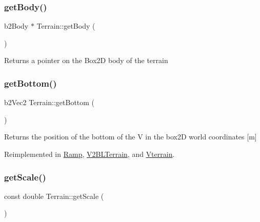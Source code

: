 \mbox{\label{class_terrain_aa0e70c6bbd39935c69c2b6edb74fcd32}} 
\subsubsection{\texorpdfstring{get\+Body()}{getBody()}}
{\footnotesize\ttfamily b2\+Body $\ast$ Terrain\+::get\+Body (\begin{DoxyParamCaption}{ }\end{DoxyParamCaption})}

\begin{DoxyReturn}{Returns}
a pointer on the Box2D body of the terrain 
\end{DoxyReturn}
\mbox{\label{class_terrain_a26e1c7c05b8256015730df34d97d29c2}} 
\subsubsection{\texorpdfstring{get\+Bottom()}{getBottom()}}
{\footnotesize\ttfamily b2\+Vec2 Terrain\+::get\+Bottom (\begin{DoxyParamCaption}{ }\end{DoxyParamCaption})\hspace{0.3cm}{\ttfamily [virtual]}}

\begin{DoxyReturn}{Returns}
the position of the bottom of the V in the box2D world coordinates \mbox{[}m\mbox{]} 
\end{DoxyReturn}


Reimplemented in \mbox{\hyperlink{class_ramp_a6e4926a2d16651162340113155e91e8f}{Ramp}}, \mbox{\hyperlink{class_v2_b_l_terrain_a0534b144e38d8ffea797c3713b3d5380}{V2\+B\+L\+Terrain}}, and \mbox{\hyperlink{class_vterrain_a970e49a3753e1c4bc4424b2602c25f85}{Vterrain}}.

\mbox{\label{class_terrain_af0cff27a194359a13c448c89bd374de3}} 
\subsubsection{\texorpdfstring{get\+Scale()}{getScale()}}
{\footnotesize\ttfamily const double Terrain\+::get\+Scale (\begin{DoxyParamCaption}{ }\end{DoxyParamCaption})}


